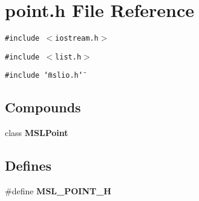 \section{point.h File Reference}
\label{point_8h}
{\tt \#include $<$iostream.h$>$}\par
{\tt \#include $<$list.h$>$}\par
{\tt \#include \char`\"{}mslio.h\char`\"{}}\par
\subsection*{Compounds}
\begin{CompactItemize}
\item 
class {\bf MSLPoint}
\end{CompactItemize}
\subsection*{Defines}
\begin{CompactItemize}
\item 
\#define {\bf MSL\_\-POINT\_\-H}
\end{CompactItemize}
